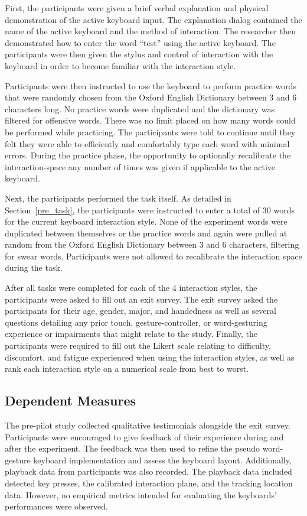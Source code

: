 First, the participants were given a brief verbal explanation and physical demonstration of the active keyboard input. The explanation dialog contained the name of the active keyboard and the method of interaction. The researcher then demonstrated how to enter the word ``test'' using the active keyboard. The participants were then given the stylus and control of interaction with the keyboard in order to become familiar with the interaction style.

Participants were then instructed to use the keyboard to perform practice words that were randomly chosen from the Oxford English Dictionary between 3 and 6 characters long. No practice words were duplicated and the dictionary was filtered for offensive words. There was no limit placed on how many words could be performed while practicing. The participants were told to continue until they felt they were able to efficiently and comfortably type each word with minimal errors. During the practice phase, the opportunity to optionally recalibrate the interaction-space any number of times was given if applicable to the active keyboard.

Next, the participants performed the task itself. As detailed in Section~\ref{pre_task}, the participants were instructed to enter a total of 30 words for the current keyboard interaction style. None of the experiment words were duplicated between themselves or the practice words and again were pulled at random from the Oxford English Dictionary between 3 and 6 characters, filtering for swear words. Participants were not allowed to recalibrate the interaction space during the task. 

After all tasks were completed for each of the 4 interaction styles, the participants were asked to fill out an exit survey. The exit survey asked the participants for their age, gender, major, and handedness as well as several questions detailing any prior touch, gesture-controller, or word-gesturing experience or impairments that might relate to the study. Finally, the participants were required to fill out the Likert scale relating to difficulty, discomfort, and fatigue experienced when using the interaction styles, as well as rank each interaction style on a numerical scale from best to worst.

\subsection{Dependent Measures}
The pre-pilot study collected qualitative testimonials alongside the exit survey. Participants were encouraged to give feedback of their experience during and after the experiment. The feedback was then used to refine the pseudo word-gesture keyboard implementation and assess the keyboard layout. Additionally, playback data from participants was also recorded. The playback data included detected key presses, the calibrated interaction plane, and the tracking location data. However, no empirical metrics intended for evaluating the keyboards' performances were observed.

